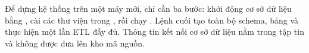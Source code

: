 Để dựng hệ thống trên một máy mới, chỉ cần ba bước: khởi động cơ sở dữ liệu bằng , cài các thư viện trong , rồi chạy . Lệnh cuối tạo toàn bộ schema, bảng và thực hiện một lần ETL đầy đủ. Thông tin kết nối cơ sở dữ liệu nằm trong tập tin  và không được đưa lên kho mã nguồn.
